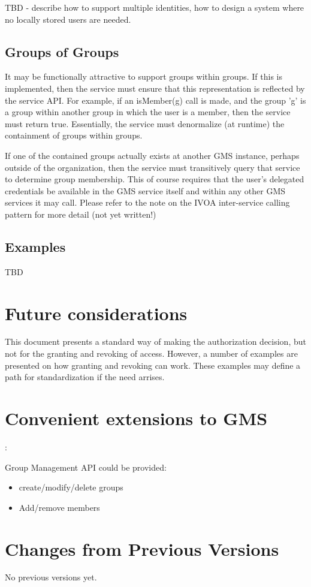 \documentclass[11pt,a4paper]{ivoa}
\begin{document}
TBD - describe how to support multiple identities, how to design a system where no locally stored users are needed.

\subsection{Groups of Groups}

It may be functionally attractive to support groups within groups.  If this is implemented, then the service must ensure that this representation is reflected by the service API.  For example, if an isMember(g) call is made, and the group 'g' is a group within another group in which the user is a member, then the service must return true.  Essentially, the service must denormalize (at runtime) the containment of groups within groups.

If one of the contained groups actually exists at another GMS instance, perhaps outside of the organization, then the service must transitively query that service to determine group membership.  This of course requires that the user's delegated credentials be available in the GMS service itself and within any other GMS services it may call.  Please refer to the note on the IVOA inter-service calling pattern for more detail \citep{note:IVOSvcPatterns} (not yet written!)


\subsection {Examples}

TBD

\section {Future considerations}

This document presents a standard way of making the authorization decision, but not for the granting and revoking of access.  However, a number of examples are presented on how granting and revoking can work.  These examples may define a path for standardization if the need arrises.

\appendix

\section{Convenient extensions to GMS}:

Group Management API could be provided:
\begin{itemize}
\item create/modify/delete groups
\item Add/remove members
\end{itemize}

\section{Changes from Previous Versions}

No previous versions yet.  



\end{document}

